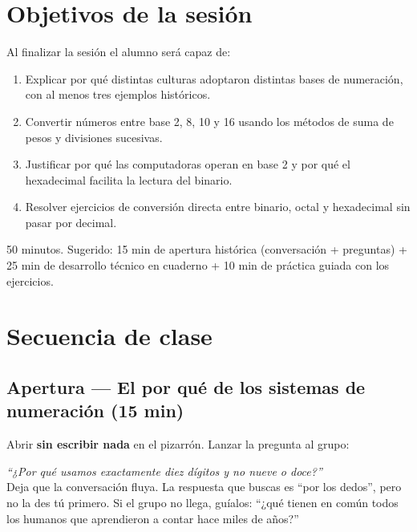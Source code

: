 \documentclass[12pt, oneside]{article}
\begin{document}

\tableofcontents
\newpage

\section{Objetivos de la sesión}

Al finalizar la sesión el alumno será capaz de:

\begin{enumerate}
  \item Explicar por qué distintas culturas adoptaron distintas bases de
        numeración, con al menos tres ejemplos históricos.
  \item Convertir números entre base 2, 8, 10 y 16 usando los métodos
        de suma de pesos y divisiones sucesivas.
  \item Justificar por qué las computadoras operan en base 2 y por qué
        el hexadecimal facilita la lectura del binario.
  \item Resolver ejercicios de conversión directa entre binario, octal
        y hexadecimal sin pasar por decimal.
\end{enumerate}

\begin{notaprofesor}
  50 minutos. Sugerido: 15 min de apertura histórica (conversación
  + preguntas) + 25 min de desarrollo técnico en cuaderno + 10 min de
  práctica guiada con los ejercicios.
\end{notaprofesor}

\section{Secuencia de clase}

\subsection{Apertura — El por qué de los sistemas de numeración (15 min)}

Abrir \textbf{sin escribir nada} en el pizarrón. Lanzar la pregunta al grupo:

\begin{notaprofesor}
  \textit{``¿Por qué usamos exactamente diez dígitos y no nueve o doce?''}\\[4pt]
  Deja que la conversación fluya. La respuesta que buscas es ``por los dedos'',
  pero no la des tú primero. Si el grupo no llega, guíalos: ``¿qué tienen
  en común todos los humanos que aprendieron a contar hace miles de años?''
\end{notaprofesor}
\end{document}
